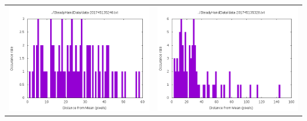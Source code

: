 \documentclass[10pt,letterpaper]{article}
\begin{document}
\begin{table}
\begin{tabular}{cc}
\includegraphics[scale=.5]{graph-data-201745135246.png} & \includegraphics[scale=.5]{graph-data-201745135328.png}\\

\end{tabular}
\end{table}
\end{document}
